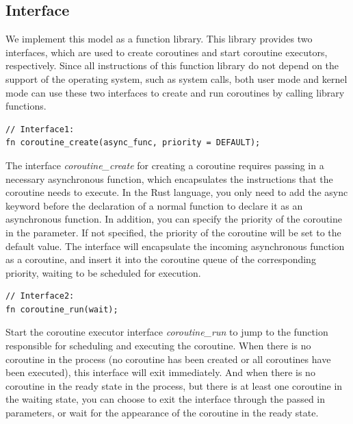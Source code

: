 \documentclass[10pt]{article}
\begin{document}
\subsection{Interface}
We implement this model as a function library. This library provides two interfaces, which are used to create coroutines and start coroutine executors, respectively. Since all instructions of this function library do not depend on the support of the operating system, such as system calls, both user mode and kernel mode can use these two interfaces to create and run coroutines by calling library functions.


\begin{lstlisting}
// Interface1:
fn coroutine_create(async_func, priority = DEFAULT);
\end{lstlisting}

The interface \textit{coroutine\_create} for creating a coroutine requires passing in a necessary asynchronous function, which encapsulates the instructions that the coroutine needs to execute. In the Rust language, you only need to add the async keyword before the declaration of a normal function to declare it as an asynchronous function. In addition, you can specify the priority of the coroutine in the parameter. If not specified, the priority of the coroutine will be set to the default value. The interface will encapsulate the incoming asynchronous function as a coroutine, and insert it into the coroutine queue of the corresponding priority, waiting to be scheduled for execution.

\begin{lstlisting}
// Interface2:
fn coroutine_run(wait);
\end{lstlisting}

Start the coroutine executor interface \textit{coroutine\_run} to jump to the function responsible for scheduling and executing the coroutine. When there is no coroutine in the process (no coroutine has been created or all coroutines have been executed), this interface will exit immediately. And when there is no coroutine in the ready state in the process, but there is at least one coroutine in the waiting state, you can choose to exit the interface through the passed in parameters, or wait for the appearance of the coroutine in the ready state.
\end{document}

